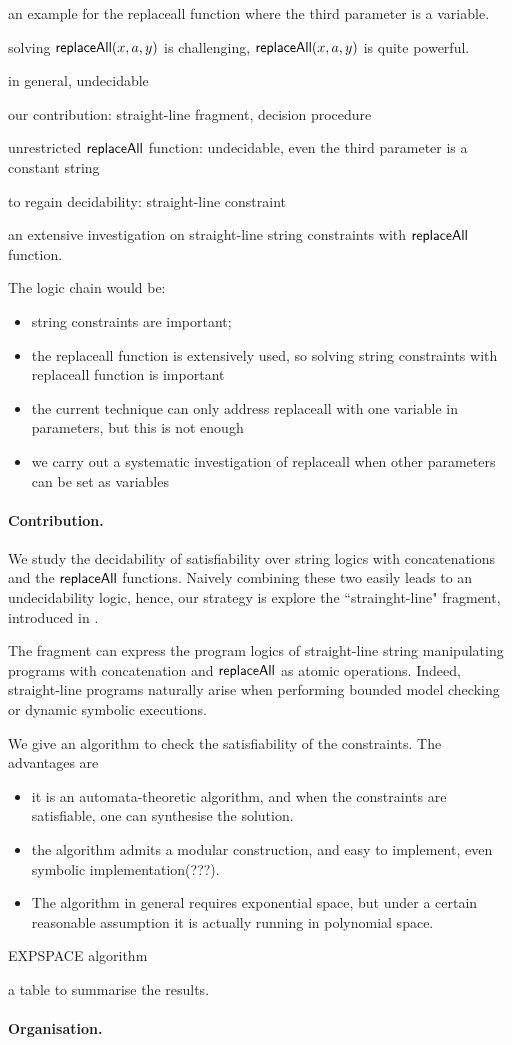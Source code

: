 an example for the replaceall function where the third parameter is a variable. 



solving $\mathsf{replaceAll}(x, a, y)$ is challenging, $\mathsf{replaceAll}(x,a, y)$ is quite powerful.

in general, undecidable 

our contribution: straight-line fragment, decision procedure

\cite{LB16,TCJ16,YABI14}

unrestricted $\mathsf{replaceAll}$ function: undecidable, even the third parameter is a constant string

to regain decidability: straight-line constraint

an extensive investigation on straight-line string constraints with $\mathsf{replaceAll}$ function. 


The logic chain would be:
\begin{itemize}
	\item string constraints are important;
	\item the replaceall function is extensively used, so solving string constraints with replaceall function is important
	\item the current technique \cite{LB16} can only address replaceall with one variable in parameters, but this is not enough
	\item we carry out a systematic investigation of replaceall when other parameters can be set as variables 
\end{itemize}

\paragraph{Contribution.} We study the decidability of satisfiability over string logics with concatenations and the $\mathsf{replaceAll}$ functions. Naively combining these two easily leads to an undecidability logic, hence, our strategy is explore the ``strainght-line" fragment, introduced in \cite{LB16}. 

The fragment can express the program logics of straight-line string manipulating programs with concatenation and $\mathsf{replaceAll}$ as atomic operations. Indeed, straight-line programs naturally arise when performing bounded model checking or dynamic symbolic executions. 

We give an algorithm to check the satisfiability of the constraints. The advantages are 
\begin{itemize}
	\item it is an automata-theoretic algorithm, and when the constraints are satisfiable, one can synthesise the solution. 
	
	\item the algorithm admits a modular construction, and easy to implement, even symbolic implementation(???). 
	
	
	\item The algorithm in general requires exponential space, but under a certain reasonable assumption it is actually running in polynomial space. 
\end{itemize}



EXPSPACE algorithm

a table to summarise the results.


\paragraph{Organisation.} 


